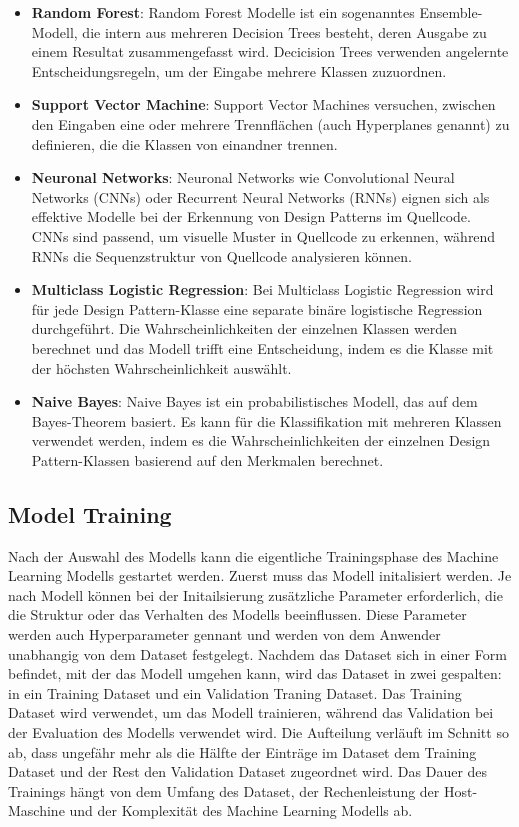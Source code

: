 \documentclass[conference]{IEEEtran}
\begin{document}
\begin{itemize}
    \item \textbf{Random Forest}: Random Forest Modelle ist ein sogenanntes Ensemble-Modell, die intern aus mehreren Decision Trees besteht, deren Ausgabe zu einem Resultat zusammengefasst wird. Decicision Trees verwenden angelernte Entscheidungsregeln, um der Eingabe mehrere Klassen zuzuordnen.
    \item \textbf{Support Vector Machine}: Support Vector Machines versuchen, zwischen den Eingaben eine oder mehrere Trennflächen (auch Hyperplanes genannt) zu definieren, die die Klassen von einandner trennen.
    \item \textbf{Neuronal Networks}: Neuronal Networks wie Convolutional Neural Networks (CNNs) oder Recurrent Neural Networks (RNNs) eignen sich als effektive Modelle bei der Erkennung von Design Patterns im Quellcode. CNNs sind passend, um visuelle Muster in Quellcode zu erkennen, während RNNs die Sequenzstruktur von Quellcode analysieren können.
    \item \textbf{Multiclass Logistic Regression}: Bei Multiclass Logistic Regression wird für jede Design Pattern-Klasse eine separate binäre logistische Regression durchgeführt. Die Wahrscheinlichkeiten der einzelnen Klassen werden berechnet und das Modell trifft eine Entscheidung, indem es die Klasse mit der höchsten Wahrscheinlichkeit auswählt.
    \item \textbf{Naive Bayes}: Naive Bayes ist ein probabilistisches Modell, das auf dem Bayes-Theorem basiert. Es kann für die Klassifikation mit mehreren Klassen verwendet werden, indem es die Wahrscheinlichkeiten der einzelnen Design Pattern-Klassen basierend auf den Merkmalen berechnet.
\end{itemize}

\newpage

\subsection{Model Training}

Nach der Auswahl des Modells kann die eigentliche Trainingsphase des Machine Learning Modells gestartet werden.
Zuerst muss das Modell initalisiert werden. Je nach Modell können bei der Initailsierung zusätzliche Parameter erforderlich, die die Struktur oder das Verhalten des Modells beeinflussen. Diese Parameter werden auch Hyperparameter gennant und werden von dem Anwender unabhangig von dem Dataset festgelegt.
Nachdem das Dataset sich in einer Form befindet, mit der das Modell umgehen kann, wird das Dataset in zwei gespalten: in ein Training Dataset und ein Validation Traning Dataset.
Das Training Dataset wird verwendet, um das Modell trainieren, während das Validation bei der Evaluation des Modells verwendet wird. Die Aufteilung verläuft im Schnitt so ab, dass ungefähr mehr als die Hälfte der Einträge im Dataset dem Training Dataset und der Rest den Validation Dataset zugeordnet wird.
Das Dauer des Trainings hängt von dem Umfang des Dataset, der Rechenleistung der Host-Maschine und der Komplexität des Machine Learning Modells ab.
\end{document}
